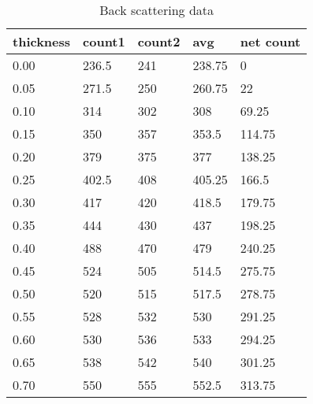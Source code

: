\begin{table}[H]
    \centering
    \begin{tabular}{|l|l|l|l|l|}
    \hline
        thickness & count1 & count2 & avg & net count \\ \hline
        0.00 & 236.5 & 241 & 238.75 & 0 \\ \hline
        0.05 & 271.5 & 250 & 260.75 & 22 \\ \hline
        0.10 & 314 & 302 & 308 & 69.25 \\ \hline
        0.15 & 350 & 357 & 353.5 & 114.75 \\ \hline
        0.20 & 379 & 375 & 377 & 138.25 \\ \hline
        0.25 & 402.5 & 408 & 405.25 & 166.5 \\ \hline
        0.30 & 417 & 420 & 418.5 & 179.75 \\ \hline
        0.35 & 444 & 430 & 437 & 198.25 \\ \hline
        0.40 & 488 & 470 & 479 & 240.25 \\ \hline
        0.45 & 524 & 505 & 514.5 & 275.75 \\ \hline
        0.50 & 520 & 515 & 517.5 & 278.75 \\ \hline
        0.55 & 528 & 532 & 530 & 291.25 \\ \hline
        0.60 & 530 & 536 & 533 & 294.25 \\ \hline
        0.65 & 538 & 542 & 540 & 301.25 \\ \hline
        0.70 & 550 & 555 & 552.5 & 313.75 \\ \hline
    \end{tabular}

    \caption{Back scattering data}
\end{table}